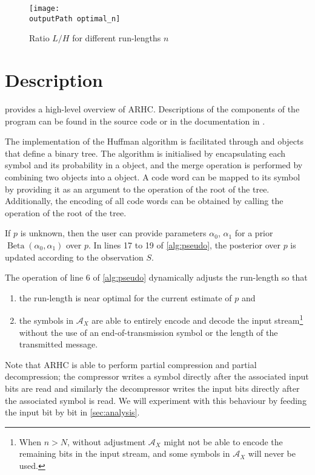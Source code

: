 \documentclass[letterpaper,11pt]{extarticle}
\newcommand{\outputPath}{output/}
\begin{document}
\begin{figure}[ht]
    \centering
    \texttt{[image: \\outputPath optimal\_n]}
    \caption{Ratio $L/H$ for different run-lengths $n$}
    \label{fig:ratio}
\end{figure}


\section{Description}
 provides a high-level overview of ARHC. Descriptions of the components of the program can be found in the source code or in the documentation in .

The implementation of the Huffman algorithm is facilitated through  and  objects that define a binary tree. The algorithm is initialised by encapsulating each symbol and its probability in a  object, and the merge operation is performed by combining two  objects into a  object. A code word can be mapped to its symbol by providing it as an argument to the  operation of the root  of the tree. Additionally, the encoding of all code words can be obtained by calling the  operation of the root  of the tree.

If $p$ is unknown, then the user can provide parameters $\alpha_0$, $\alpha_1$ for a prior $\operatorname{Beta}(\alpha_0, \alpha_1)$ over $p$. In lines 17 to 19 of \cref{alg:pseudo}, the posterior over $p$ is updated according to the observation $S$.

The operation of line 6 of \cref{alg:pseudo} dynamically adjusts the run-length so that
\begin{enumerate}
    \item the run-length is near optimal for the current estimate of $p$ and
    \item the symbols in $\mathcal{A}_X$ are able to entirely encode and decode the input stream\footnote{When $n>N$, without adjustment $\mathcal{A}_X$ might not be able to encode the remaining bits in the input stream, and some symbols in $\mathcal{A}_X$ will never be used.} without the use of an end-of-transmission symbol or the length of the transmitted message.
\end{enumerate}

Note that ARHC is able to perform partial compression and partial decompression; the compressor writes a symbol directly after the associated input bits are read and similarly the decompressor writes the input bits directly after the associated symbol is read. We will experiment with this behaviour by feeding the input bit by bit in \cref{sec:analysis}.
\end{document}
